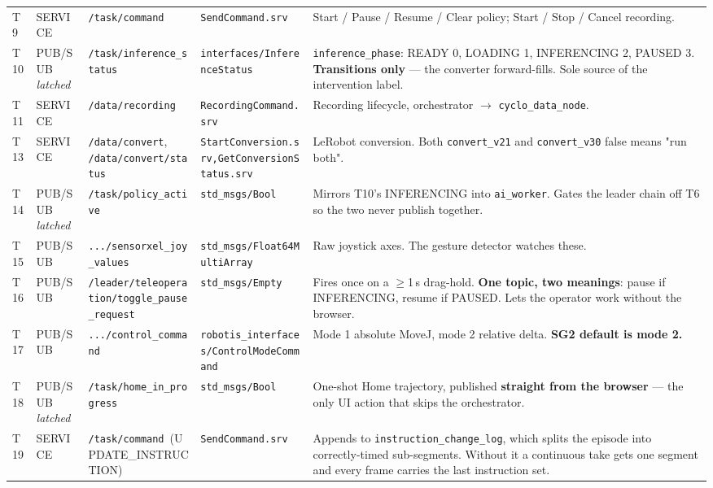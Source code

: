 \documentclass{article}
\begin{document}
{\begin{longtable}{p{9mm}p{24mm}p{76mm}p{50mm}p{196mm}}
T9 & \small SERVICE & \texttt{\small /task/command} & \texttt{\small SendCommand.srv} & \small Start / Pause / Resume / Clear policy; Start / Stop / Cancel recording.\\
T10 & \small PUB/SUB \emph{latched} & \texttt{\small /task/inference\_status} & \texttt{\small interfaces/\allowbreak InferenceStatus} & \small \texttt{inference\_phase}: READY 0, LOADING 1, INFERENCING 2, PAUSED 3. \textbf{Transitions only} --- the converter forward-fills. Sole source of the intervention label.\\
T11 & \small SERVICE & \texttt{\small /data/recording} & \texttt{\small RecordingCommand.srv} & \small Recording lifecycle, orchestrator $\to$ \texttt{cyclo\_data\_node}.\\
T13 & \small SERVICE & \texttt{\small /data/convert}, \texttt{\small /data/convert/status} & \texttt{\small StartConversion.srv,\allowbreak GetConversionStatus.srv} & \small LeRobot conversion. Both \texttt{convert\_v21} and \texttt{convert\_v30} false means "run both".\\
T14 & \small PUB/SUB \emph{latched} & \texttt{\small /task/policy\_active} & \texttt{\small std\_msgs/Bool} & \small Mirrors T10's INFERENCING into \texttt{ai\_worker}. Gates the leader chain off T6 so the two never publish together.\\
T15 & \small PUB/SUB & \texttt{\small .../sensorxel\_joy\_values} & \texttt{\small std\_msgs/\allowbreak Float64MultiArray} & \small Raw joystick axes. The gesture detector watches these.\\
T16 & \small PUB/SUB & \texttt{\small /leader/teleoperation/\allowbreak toggle\_pause\_request} & \texttt{\small std\_msgs/Empty} & \small Fires once on a $\geq$1\,s drag-hold. \textbf{One topic, two meanings}: pause if INFERENCING, resume if PAUSED. Lets the operator work without the browser.\\
T17 & \small PUB/SUB & \texttt{\small .../control\_command} & \texttt{\small robotis\_interfaces/\allowbreak ControlModeCommand} & \small Mode 1 absolute MoveJ, mode 2 relative delta. \textbf{SG2 default is mode 2.}\\
T18 & \small PUB/SUB \emph{latched} & \texttt{\small /task/home\_in\_progress} & \texttt{\small std\_msgs/Bool} & \small One-shot Home trajectory, published \textbf{straight from the browser} --- the only UI action that skips the orchestrator.\\
T19 & \small SERVICE & \texttt{\small /task/command}\ (UPDATE\_INSTRUCTION) & \texttt{\small SendCommand.srv} & \small Appends to \texttt{instruction\_change\_log}, which splits the episode into correctly-timed sub-segments. Without it a continuous take gets one segment and every frame carries the last instruction set.\\
\hline
\end{longtable}}
\end{document}
